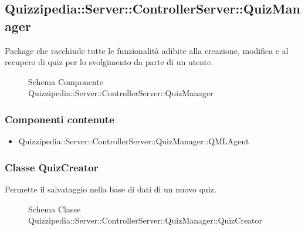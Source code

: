 \subsection{Quizzipedia::Server::ControllerServer::QuizManager}
Package che racchiude tutte le funzionalità adibite alla creazione, modifica e al recupero di quiz per lo svolgimento da parte di un utente.
\begin{figure}[H]
\centering
\noindent{}
\caption[Schema Componente Quizzipedia::Server::ControllerServer::QuizManager]{Schema Componente Quizzipedia::Server::ControllerServer::QuizManager}
\end{figure}
\subsubsection{Componenti contenute}
\begin{itemize}
\item Quizzipedia::Server::ControllerServer::QuizManager::QMLAgent
\end{itemize}
\subsubsection{Classe QuizCreator}
Permette il salvataggio nella base di dati di un nuovo quiz.
\begin{figure}[H]
\centering
\noindent{}
\caption[Schema Classe QuizCreator]{Schema Classe Quizzipedia::Server::ControllerServer::QuizManager::QuizCreator}
\end{figure}

